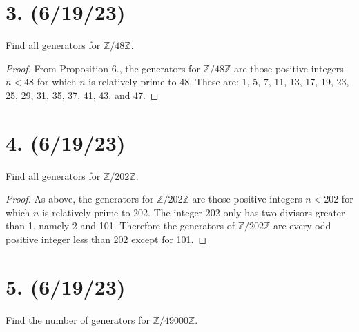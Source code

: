 \documentclass{article}
\begin{document}
\section*{3. (6/19/23)}

Find all generators for $\mathbb{Z}/48\mathbb{Z}$.

\begin{proof}
    From Proposition 6., the generators for $\mathbb{Z}/48\mathbb{Z}$ are those positive integers $n < 48$ for which $n$ is relatively prime to 48. These are: 1, 5, 7, 11, 13, 17, 19, 23, 25, 29, 31, 35, 37, 41, 43, and 47.
\end{proof}

\section*{4. (6/19/23)}

Find all generators for $\mathbb{Z}/202\mathbb{Z}$.

\begin{proof}
    As above, the generators for $\mathbb{Z}/202\mathbb{Z}$ are those positive integers $n < 202$ for which $n$ is relatively prime to 202. The integer 202 only has two divisors greater than 1, namely 2 and 101. Therefore the generators of $\mathbb{Z}/202\mathbb{Z}$ are every odd positive integer less than 202 except for 101.
\end{proof}

\section*{5. (6/19/23)}

Find the number of generators for $\mathbb{Z}/49000\mathbb{Z}$.
\end{document}
